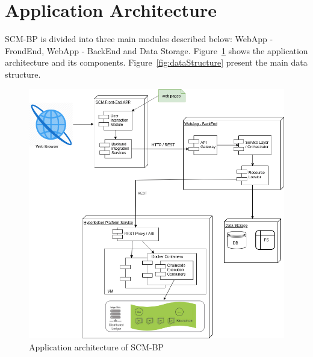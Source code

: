 \section{Application Architecture}\label{sec:applicationArchitecture}

\ac{SCM-BP} is divided into three main modules described below: WebApp - FrondEnd, WebApp - BackEnd and Data Storage. Figure~\ref{fig:detalhamentotecnico} shows the application architecture and its components. Figure~\ref{fig:dataStructure} present the main data structure.

\begin{figure}[htbp]
\begin{center}
  \includegraphics[scale=0.55]{images/detalhamentotecnico.png}
\caption{Application architecture of \ac{SCM-BP}}
\label{fig:detalhamentotecnico}
\end{center}
\end{figure}



